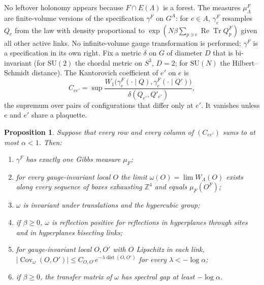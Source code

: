 \documentclass[11pt]{amsart}
\newtheorem{proposition}[theorem]{Proposition}
\theoremstyle{definition}
\theoremstyle{remark}
\numberwithin{equation}{section}
\newcommand{\Z}{\mathbb{Z}}
\newcommand{\SU}{\mathrm{SU}}
\newcommand{\ReTr}{\operatorname{Re}\operatorname{Tr}}
\newcommand{\Cov}{\operatorname{Cov}}
\newcommand{\dist}{\operatorname{dist}}
\begin{document}
No leftover holonomy appears because $F\cap E(\Lambda)$ is a forest. The
measures $\mu^F_\Lambda$ are finite-volume versions of the specification
$\gamma^F$ on $G^A$: for $e\in A$, $\gamma^F_e$ resamples $Q_e$ from the law
with density proportional to $\exp(N\beta\sum_{p\ni e}\ReTr Q^F_p)$ given all
other active links. No infinite-volume gauge transformation is performed;
$\gamma^F$ is a specification in its own right. Fix a metric $\delta$ on $G$
of diameter $D$ that is bi-invariant (for $\SU(2)$ the chordal metric on
$S^3$, $D=2$; for $\SU(N)$ the Hilbert--Schmidt distance). The Kantorovich
coefficient of $e'$ on $e$ is
\[
C_{ee'}=\sup\frac{W_1\bigl(\gamma^F_e(\cdot\mid Q),\gamma^F_e(\cdot\mid
Q')\bigr)}{\delta(Q_{e'},Q'_{e'})},
\]
the supremum over pairs of configurations that differ only at $e'$. It
vanishes unless $e$ and $e'$ share a plaquette.

\begin{proposition}\label{prop:state}
Suppose that every row and every column of $(C_{ee'})$ sums to at most
$\alpha<1$. Then:
\begin{enumerate}[label=\textup{(\roman*)},leftmargin=*]
\item $\gamma^F$ has exactly one Gibbs measure $\mu_F$;
\item for every gauge-invariant local $O$ the limit $\omega(O)=\lim
W_\Lambda(O)$ exists along every sequence of boxes exhausting $\Z^4$ and
equals $\mu_F(O^F)$;
\item $\omega$ is invariant under translations and the hypercubic group;
\item if $\beta\ge0$, $\omega$ is reflection positive for reflections in
hyperplanes through sites and in hyperplanes bisecting links;
\item for gauge-invariant local $O,O'$ with $O$ Lipschitz in each link,
$|\Cov_\omega(O,O')|\le C_{O,O'}e^{-\lambda\dist(O,O')}$ for every
$\lambda<-\log\alpha$;
\item if $\beta\ge0$, the transfer matrix of $\omega$ has spectral gap at
least $-\log\alpha$.
\end{enumerate}
\end{proposition}
\end{document}
